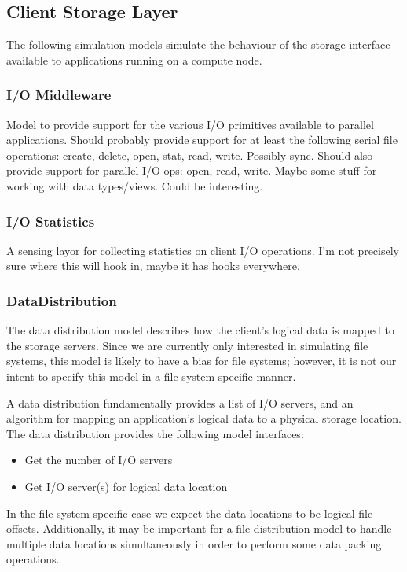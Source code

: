 \documentclass[11pt]{article}
\begin{document}
\subsection{Client Storage Layer}
The following simulation models simulate the behaviour of the storage
interface available to applications running on a compute node.

\subsubsection{I/O Middleware}
Model to provide support for the various I/O primitives available to parallel
applications.  Should probably provide support for at least the following
serial file operations:  create, delete, open, stat, read, write.  Possibly 
sync.  Should also provide support for parallel I/O ops: open, read, write.
Maybe some stuff for working with data types/views.  Could be interesting.

\subsubsection{I/O Statistics}
A sensing layor for collecting statistics on client I/O operations.  I'm not
precisely sure where this will hook in, maybe it has hooks everywhere.

\subsubsection{DataDistribution}
The data distribution model describes how the client's logical data is mapped
to the storage servers.  Since we are currently only interested in simulating
file systems, this model is likely to have a bias for file systems; however, it
is not our intent to specify this model in a file system specific manner.

A data distribution fundamentally provides a list of I/O servers, and an
algorithm for mapping an application's logical data to a physical storage
location.  The data distribution provides the following model interfaces:

\begin{itemize}
\item Get the number of I/O servers
\item Get I/O server(s) for logical data location
\end{itemize}

In the file system specific case we expect the data locations to be logical 
file offsets.  Additionally, it may be important for a file distribution
model to handle multiple data locations simultaneously in order to perform
some data packing operations.
\end{document}
